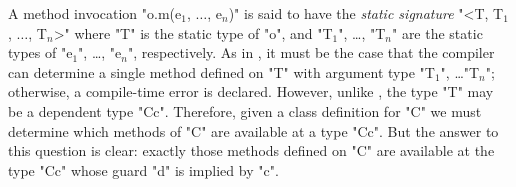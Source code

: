 A method invocation \xcdmath"o.m(e$_1$, $\dots$, e$_n$)"
is said to have the {\em static signature}
\xcdmath"<T, T$_1$, $\dots$, T$_n$>" where \xcd"T" is the static type of
\xcd"o", and
\xcdmath"T$_1$",
\dots,
\xcdmath"T$_n$"
are the static types of \xcdmath"e$_1$", \dots, \xcdmath"e$_n$",
respectively.  As in
\Java, it must be the case that the compiler can determine a single
method defined on \xcd"T" with argument type
\xcdmath"T$_1$", \dots \xcdmath"T$_n$"; otherwise, a
compile-time error is declared. However, unlike \Java, the \Xten{} type \xcd"T"
may be a dependent type \xcd"C{c}". Therefore, given a class definition for
\xcd"C" we must determine which methods of \xcd"C" are available at a type
\xcd"C{c}". But the answer to this question is clear: exactly those methods
defined on \xcd"C" are available at the type \xcd"C{c}"
whose guard \xcd"d" is implied by \xcd"c".



